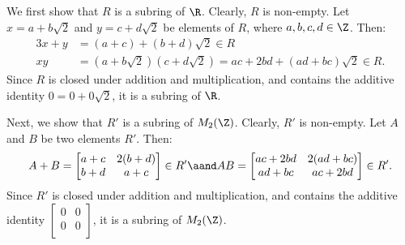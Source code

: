 \begin{solution}
  We first show that $R$ is a subring of $\R$. Clearly, $R$ is non-empty. Let $x = a + b\sqrt{2}$ and $y = c + d\sqrt{2}$ be elements of $R$, where $a, b, c, d \in \Z$. Then:
  \begin{align*}{3}
    x + y &= (a + c) + (b + d)\sqrt{2} \in R \\
    xy &= (a + b\sqrt{2})(c + d\sqrt{2}) = ac + 2bd + (ad + bc)\sqrt{2} \in R
  .\end{align*}
  Since $R$ is closed under addition and multiplication, and contains the additive identity $0 = 0 + 0\sqrt{2}$, it is a subring of $\R$.

  Next, we show that $R'$ is a subring of $M_2(\Z)$. Clearly, $R'$ is non-empty. Let $A$ and $B$ be two elements $R'$. Then:
  \[%
    A + B = \begin{bmatrix}
      a + c & 2(b + d) \\
      b + d & a + c \\
    \end{bmatrix} \in R' \aand AB = \begin{bmatrix}
      ac + 2bd & 2(ad + bc) \\
      ad + bc & ac + 2bd \\
    \end{bmatrix} \in R'
  .\]%
  Since $R'$ is closed under addition and multiplication, and contains the additive identity $\begin{bmatrix}
    0 & 0 \\
    0 & 0 \\
  \end{bmatrix}$, it is a subring of $M_2(\Z)$.


\end{solution}
